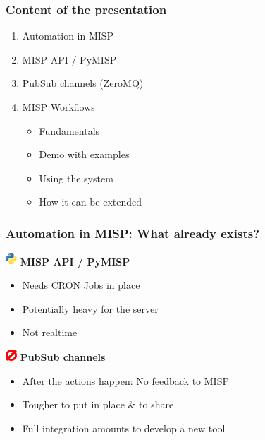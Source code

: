 
\begin{frame}[t,plain]
\titlepage
\end{frame}

\begin{frame}
    \frametitle{Content of the presentation}
    \begin{enumerate}
        \item Automation in MISP
        \item MISP API / PyMISP
        \item PubSub channels (ZeroMQ)
        \item MISP Workflows
        \begin{itemize}
            \item Fundamentals
            \item Demo with examples
            \item Using the system
            \item How it can be extended
        \end{itemize}
    \end{enumerate}
\end{frame}

\begin{frame}
    \frametitle{Automation in MISP: What already exists?}
    \includegraphics[valign=m,width=16px]{pictures/python-logo.png}\hspace*{0.5em} \textbf{MISP API / PyMISP}
    \hspace*{0.25em}
    \begin{itemize}
        \item Needs CRON Jobs in place
        \item Potentially heavy for the server
        \item Not realtime
    \end{itemize}
    \vspace*{1em}
    \includegraphics[valign=m,width=16px]{pictures/zeromq.png}\hspace*{0.5em} \textbf{PubSub channels}
    \hspace*{0.25em}
    \begin{itemize}
        \item After the actions happen: No feedback to MISP
        \item Tougher to put in place \& to share
        \item Full integration amounts to develop a new tool
    \end{itemize}
    \vspace*{0.5em}
\end{frame}

